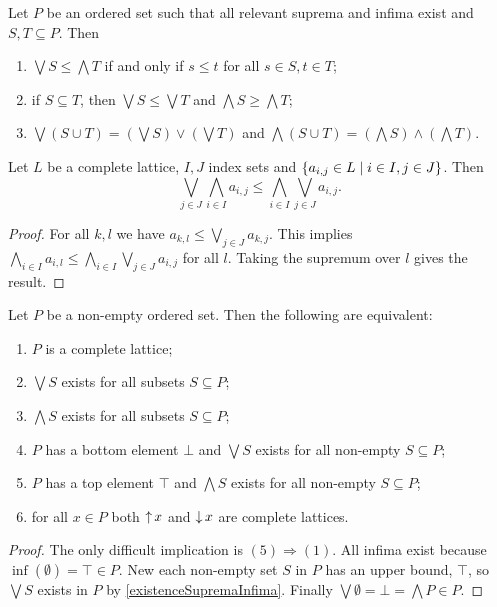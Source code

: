 \begin{lemma}
Let $P$ be an ordered set such that all relevant suprema and infima exist and $S,T\subseteq P$. Then
\begin{enumerate}
\item $\bigvee S \leq \bigwedge T$ if and only if $s\leq t$ for all $s\in S,t\in T$;
\item if $S\subseteq T$, then $\bigvee S \leq \bigvee T$ and $\bigwedge S \geq \bigwedge T$;
\item $\bigvee(S\cup T) = \left(\bigvee S\right)\vee \left(\bigvee T\right)$ and $\bigwedge(S\cup T) = \left(\bigwedge S\right)\wedge \left(\bigwedge T\right)$.
\end{enumerate}
\end{lemma}

\begin{proposition}
Let $L$ be a complete lattice, $I,J$ index sets and $\setbuilder{a_{i,j}\in L}{i\in I, j\in J}$. Then
\[ \bigvee_{j\in J}\bigwedge_{i\in I}a_{i,j} \leq \bigwedge_{i\in I}\bigvee_{j\in J} a_{i,j}. \]
\end{proposition}
\begin{proof}
For all $k,l$ we have $a_{k,l}\leq \bigvee_{j\in J} a_{k,j}$. This implies $\bigwedge_{i\in I} a_{i,l} \leq \bigwedge_{i\in I}\bigvee_{j\in J} a_{i,j}$ for all $l$. Taking the supremum over $l$ gives the result.
\end{proof}

\begin{proposition} \label{completeLatticeBasic}
Let $P$ be a non-empty ordered set. Then the following are equivalent:
\begin{enumerate}
\item $P$ is a complete lattice;
\item $\bigvee S$ exists for all subsets $S\subseteq P$;
\item $\bigwedge S$ exists for all subsets $S\subseteq P$;
\item $P$ has a bottom element $\bot$ and $\bigvee S$ exists for all non-empty $S\subseteq P$;
\item $P$ has a top element $\top$ and $\bigwedge S$ exists for all non-empty $S\subseteq P$;
\item for all $x\in P$ both $\operatorname{\uparrow} x$ and $\operatorname{\downarrow} x$ are complete lattices.
\end{enumerate}
\end{proposition}
\begin{proof}
The only difficult implication is $(5)\Rightarrow (1)$. All infima exist because $\inf(\emptyset) = \top \in P$. New each non-empty set $S$ in $P$ has an upper bound, $\top$, so $\bigvee S$ exists in $P$ by \ref{existenceSupremaInfima}. Finally $\bigvee \emptyset = \bot = \bigwedge P \in P$.
\end{proof}

